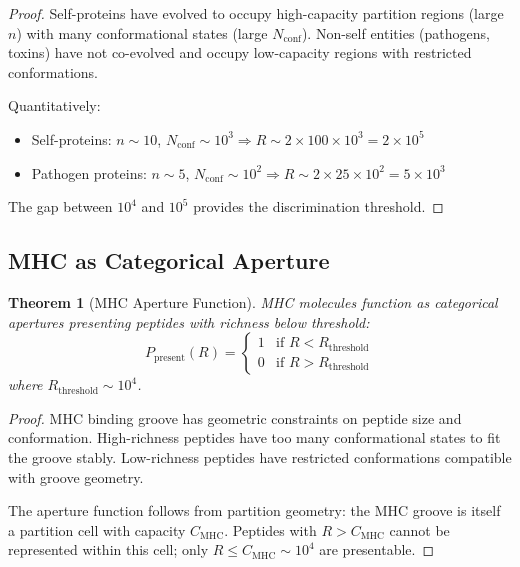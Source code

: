 \documentclass[10pt,twocolumn]{article}
\theoremstyle{plain}
\newtheorem{theorem}{Theorem}[section]
\theoremstyle{definition}
\theoremstyle{remark}
\begin{document}
\begin{proof}
Self-proteins have evolved to occupy high-capacity partition regions (large $n$) with many conformational states (large $N_{\mathrm{conf}}$). Non-self entities (pathogens, toxins) have not co-evolved and occupy low-capacity regions with restricted conformations.

Quantitatively:
\begin{itemize}
\item Self-proteins: $n \sim 10$, $N_{\mathrm{conf}} \sim 10^3 \Rightarrow R \sim 2 \times 100 \times 10^3 = 2 \times 10^5$
\item Pathogen proteins: $n \sim 5$, $N_{\mathrm{conf}} \sim 10^2 \Rightarrow R \sim 2 \times 25 \times 10^2 = 5 \times 10^3$
\end{itemize}
The gap between $10^4$ and $10^5$ provides the discrimination threshold.
\end{proof}

\subsection{MHC as Categorical Aperture}

\begin{theorem}[MHC Aperture Function]
\label{thm:mhc}
MHC molecules function as categorical apertures presenting peptides with richness below threshold:
\begin{equation}
P_{\mathrm{present}}(R) = \begin{cases}
1 & \text{if } R < R_{\mathrm{threshold}} \\
0 & \text{if } R > R_{\mathrm{threshold}}
\end{cases}
\label{eq:mhc}
\end{equation}
where $R_{\mathrm{threshold}} \sim 10^4$.
\end{theorem}

\begin{proof}
MHC binding groove has geometric constraints on peptide size and conformation. High-richness peptides have too many conformational states to fit the groove stably. Low-richness peptides have restricted conformations compatible with groove geometry.

The aperture function follows from partition geometry: the MHC groove is itself a partition cell with capacity $C_{\mathrm{MHC}}$. Peptides with $R > C_{\mathrm{MHC}}$ cannot be represented within this cell; only $R \leq C_{\mathrm{MHC}} \sim 10^4$ are presentable.
\end{proof}
\end{document}
